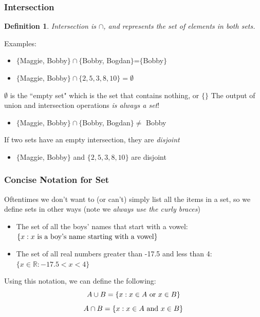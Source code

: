 \documentclass{beamer}
\newtheorem{defn}{Definition}
\numberwithin{equation}{section}
\begin{document}
\begin{frame}
\frametitle{Intersection}

\begin{defn}
Intersection is $\cap$, and represents the set of elements in \textit{both} sets.
\end{defn}
\pause

{Examples: }
\begin{itemize}
\item $\{$Maggie, Bobby$\} \cap \{$Bobby, Bogdan$\}$=$\{$Bobby$\}$ \pause
\item $\{$Maggie, Bobby$\} \cap \{2, 5, 3, 8, 10\}=\emptyset$ \pause
\end{itemize}

$\emptyset$ is the ``empty set" which is the set that contains nothing, or $\{\}$ 
The output of union and intersection operations \textit{is always a set}! \pause

\begin{itemize}
\item $\{$Maggie, Bobby$\} \cap \{$Bobby, Bogdan$\} \not=$ Bobby \pause
\end{itemize}

If two sets have an empty intersection, they are \textit{disjoint} \pause

\begin{itemize}
\item $\{$Maggie, Bobby$\}$ and $  \{2, 5, 3, 8, 10\}$ are disjoint
\end{itemize}

\end{frame}



\begin{frame}
\frametitle{Concise Notation for Set}

Oftentimes we don't want to (or can't) simply list all the items in a set, so we define sets in other ways (note  we \textit{always use the curly braces}) \pause

\begin{itemize}
\item The set of all the boys' names that start with a vowel: $\{x: x\hbox{ is a boy's name starting with a vowel}\}$
\item The set of all real numbers greater than -17.5 and less than 4: $\{x\in \mathbb{R}:-17.5<x<4\}$ \pause
\end{itemize}
 
Using this notation, we can define the following:
$$A\cup B=\{x: x\in A \hbox{ or } x\in B\}$$
$$A\cap B=\{x: x\in A \hbox{ and } x\in B\}$$

\end{frame}
\end{document}
